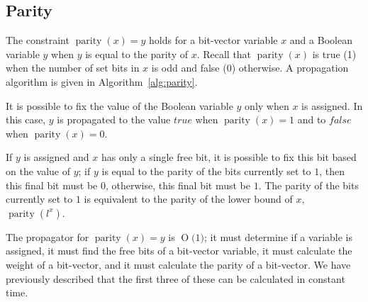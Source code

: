 \documentclass[a4paper,10pt,twoside,openright]{book}
\newcommand{\BigO}[1]{\ensuremath{\operatorname{O}\bigl(#1\bigr)}}
\newcommand*\cd[1]{\texttt{#1}}
\DeclareMathOperator{\parity}{parity}
\DeclareMathOperator{\weight}{weight}
\begin{document}

\subsection{Parity}
\label{sec:parityprop}
The constraint $\parity(x) = y$ holds for a bit-vector variable $x$ and a Boolean variable $y$ when 
$y$ is equal to the parity of $x$. Recall that $\parity(x)$ is true (1) when the number of set bits in $x$ is odd and false (0) otherwise.
A propagation algorithm is given in Algorithm~\ref{alg:parity}. 

It is possible to fix the value of the Boolean variable $y$ only when $x$ is assigned.
In this case, $y$ is propagated to the value $\mathit{true}$ when $\parity(x) = 1$
and to $\mathit{false}$ when $\parity(x) = 0$.

If $y$ is assigned and $x$ has only a single free bit,
it is possible to fix this bit based on the value of $y$;
if $y$ is equal to the parity of the bits currently set to $1$,
then this final bit must be $0$, otherwise, this final bit must be $1$.
The parity of the
bits currently set to $1$ is equivalent to the parity of the lower bound of $x$, 
$\parity(l^x)$.

The propagator for $\parity(x) = y$ is $\BigO{1}$;
it must determine if a variable is assigned,
it must find the free bits of a bit-vector variable,
it must calculate the weight of a bit-vector,
and it must calculate the parity of a bit-vector.
We have previously described that the 
first three of these 
can be calculated in constant time.
\end{document}
